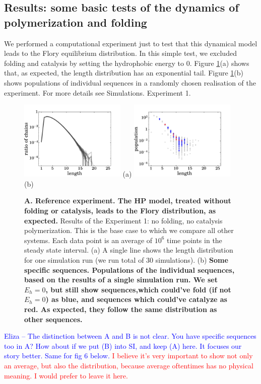 \documentclass[journal=jacsat,manuscript=article,layout=twocolumn]{achemso}
\newcommand*{\red}[1]{\textcolor{red}{#1}}
\newcommand*{\blue}[1]{\textcolor{blue}{#1}}
\begin{document}
\subsection{Results: some basic tests of the dynamics of polymerization and folding}

 We performed a computational experiment just to test that this dynamical model leads to the 
 Flory equilibrium distribution.  In this simple test, we excluded folding and catalysis by 
setting 
the hydrophobic energy to $0$. Figure \ref{fig:sim_pure_flory}(a) shows that, as expected, the 
length 
distribution has an exponential tail. Figure \ref{fig:sim_pure_flory}(b) shows populations of 
individual sequences in a randomly chosen realisation of the experiment. For more details see 
Simulations. Experiment 1.

\begin{figure}[hbt!]
  \centering
  \includegraphics[width=0.45\textwidth]{pictures/distrPlain-many.pdf} (a)
  \includegraphics[width=0.45\textwidth]{pictures/scatter01918.png} (b)
  \caption{\footnotesize{\textbf{A.  Reference experiment.  The HP model, treated without folding 
or catalysis, leads to the Flory distribution, as expected.}  Results of the Experiment 1: no 
folding, no catalysis polymerization. This 
is the base case to which we compare all other systems. Each data point is an average of 
$10^6$ time points in the steady state interval. (a) A single line shows the length distribution 
for one simulation run (we run total of 30 simulations). (b) \bf{Some specific sequences.}  
Populations of the individual sequences, based 
on the results of a single simulation run. 
We set $E_h=0$, but still show sequences,which could've fold (if not $E_h=0$) as 
blue, and sequences which could've catalyze as red. As expected, they follow the same distribution 
as other sequences.}}
  \label{fig:sim_pure_flory}
\end{figure}
\blue{Eliza -- The distinction between A and B is not clear.  You have specific sequences too in A? 
 How about if we put (B) into SI, and keep (A) here.  It focuses our story better.  Same for fig 6 
below.} \red{I believe it's very important to show not only an average, but also the distribution, 
because average oftentimes has no physical meaning. I would prefer to leave it here.}
\end{document}
